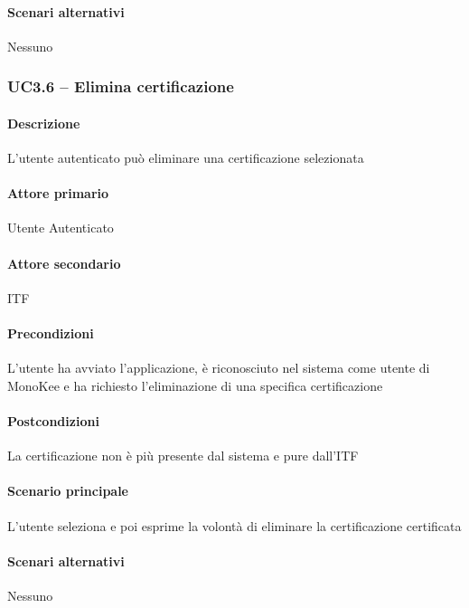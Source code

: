 \paragraph{Scenari alternativi}  Nessuno



\subsubsection{UC3.6 – Elimina certificazione}
\paragraph{Descrizione}  L’utente autenticato può eliminare una certificazione selezionata
\paragraph{Attore primario}  Utente Autenticato
\paragraph{Attore secondario}  ITF
\paragraph{Precondizioni} L’utente ha avviato l’applicazione, è riconosciuto nel sistema come utente di MonoKee e ha richiesto l’eliminazione di una specifica certificazione
\paragraph{Postcondizioni}  La certificazione non è più presente dal sistema e pure dall’ITF
\paragraph{Scenario principale}  
L’utente seleziona e poi esprime la volontà di eliminare la certificazione certificata
\paragraph{Scenari alternativi}  Nessuno

















\newpage

